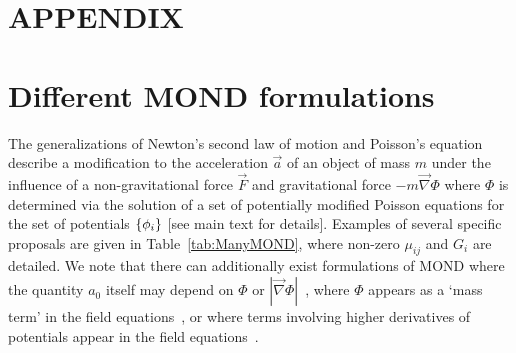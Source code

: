 \documentclass[aps,prl,reprint,superscriptaddress,nofootinbib,floatfix]{revtex4-2}
\begin{document}
\appendix
\section{APPENDIX}



\section{Different MOND formulations}

The generalizations of Newton's second law of motion and Poisson's equation describe a modification to the acceleration $\vec{a}$ of an object of mass $m$ under the influence of a non-gravitational force $\vec{F}$ and gravitational force $-m\vec{\nabla}\Phi$ where $\Phi$ is determined via the solution of a set of potentially modified Poisson equations for the set of potentials $\qty{\phi_{i}}$ [see main text for details]. 
Examples of several specific proposals are given in Table~\ref{tab:ManyMOND}, where non-zero $\mu_{ij}$ and $G_{i}$ are detailed.
We note that there can additionally exist formulations of MOND where the quantity $a_{0}$ itself may depend on $\Phi$ or $|\vec{\nabla} \Phi|$~\cite{MOND2Body-Zhao2010}, where $\Phi$ appears as a `mass term' in the field equations~\cite{RMOND-Zlosnik2021}, or where terms involving higher derivatives of potentials appear in the field equations~\cite{MOND-General-Milgrom2023}.
\end{document}
